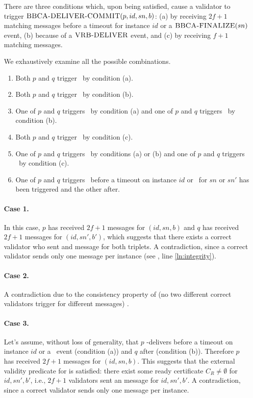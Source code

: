 There are three conditions which, upon being satisfied, cause a validator to trigger $\textsc{BBCA-DELIVER-COMMIT}(p, id, sn, b)$: (a) by receiving $2f+1$ matching \ready messages before a timeout for instance $id$ or a $\textsc{BBCA-FINALIZE}(sn)$ event, (b) because of a $\textsc{VRB-DELIVER}$ event, and (c) by receiving $f+1$ matching \checkpoint messages. 

We exhaustively examine all the possible combinations.
\begin{enumerate}
	\item Both $p$ and $q$ trigger \bbcadeliver\ by condition (a).
	\item Both $p$ and $q$ trigger \bbcadeliver\ by condition (b).
	\item One of $p$ and $q$ triggers \bbcadeliver\ by condition (a) and one of $p$ and $q$ triggers \bbcadeliver\ by condition (b).
	\item Both $p$ and $q$ trigger \bbcadeliver\ by condition (c).
	\item One of $p$ and $q$ triggers \bbcadeliver\ by conditions (a) or (b) and one of $p$ and $q$ triggers \bbcadeliver\ by condition (c).
	\item One of $p$ and $q$ triggers \bbcadeliver\ before a timeout on instance $id$ or \bbcaabort\ for $sn$ or $sn'$ has been triggered and the other after.
\end{enumerate}

\paragraph{Case 1.} In this case, $p$ has received $2f+1$ \echo messages for $(id, sn, b)$ and $q$ has received $2f+1$ \echo messages for $(id, sn', b')$, which suggests that there exists a correct validator who sent and \echo message for both triplets.
A contradiction, since a correct validator sends only one \echo message per instance (see , line \ref{ln:integrity}).

\paragraph{Case 2.}
A contradiction due to the consistency property of \brb (no two different correct validators trigger \brbdeliver for different messages) .

\paragraph{Case 3.}
Let's assume, without loss of generality, that $p$ \primitivesmall-delivers before a timeout on instance $id$ or a \bbcaabort\ event (condition (a))  and $q$ after (condition (b)).
Therefore $p$ has received $2f+1$ \echo messages for $(id, sn, b)$.
This suggests that the external validity predicate for \brb is satisfied: there exist some ready certificate $C_R\neq\emptyset$ for $id, sn', b'$, i.e., $2f+1$ validators sent an \echo message for $id, sn', b'$.
A contradiction, since a correct validator sends only one \echo message per instance.

